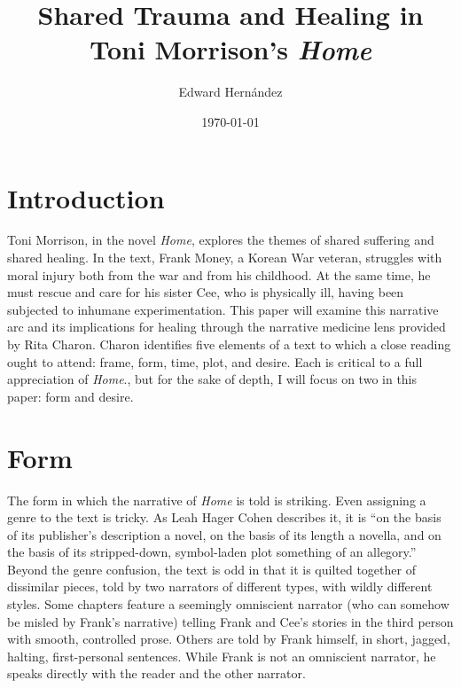 \documentclass[12pt]{article}
\begin{document}
\title{Shared Trauma and Healing in Toni Morrison's \emph{Home}}
\author{Edward Hern\'{a}ndez}
\date{\today}

\maketitle


\vspace{12pt}

\section{Introduction}

Toni Morrison, in the novel \emph{Home}\autocite{Morrison12}, explores the
themes of shared suffering and shared healing. In the text, Frank Money, a
Korean War veteran, struggles with moral injury both from the war and from his
childhood. At the same time, he must rescue and care for his sister Cee, who is
physically ill, having been subjected to inhumane experimentation.  This paper
will examine this narrative arc and its implications for healing through the
narrative medicine lens provided by Rita Charon.\autocite[ch.~6]{Charon06}
Charon identifies five elements of a text to which a close reading ought to
attend: frame, form, time, plot, and desire. Each is critical to a full
appreciation of \emph{Home}., but for the sake of depth, I will focus on two in
this paper: form and desire.

\section{Form}

The form in which the narrative of \emph{Home} is told is striking. Even
assigning a genre to the text is tricky. As Leah Hager Cohen describes it, it
is ``on the basis of its publisher’s description a novel, on the basis of its
length a novella, and on the basis of its stripped-down, symbol-laden plot
something of an allegory.''\autocite{Cohen12} Beyond the genre confusion, the
text is odd in that it is quilted together of dissimilar pieces, told by two
narrators of different types, with wildly different styles. Some chapters
feature a seemingly omniscient narrator (who can somehow be misled by Frank's
narrative) telling Frank and Cee's stories in the third person with smooth,
controlled prose. Others are told by Frank himself, in short, jagged, halting,
first-personal sentences. While Frank is not an omniscient narrator, he speaks
directly with the reader and the other narrator.
\end{document}

